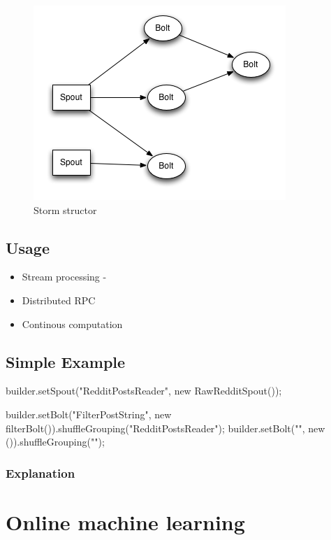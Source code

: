 \documentclass[journal]{IEEEtran/IEEEtran}
\begin{document}
\begin{figure}[htbp]
    \begin{center}
        \includegraphics[scale=0.45]{img/topology.png}
        \caption{Storm structor}
        \label{topology}
    \end{center}
\end{figure}

\subsection{Usage}

\begin{itemize}
    \item Stream processing - 
    \item Distributed RPC
    \item Continous computation
\end{itemize}

\subsection{Simple Example}

\begin{code}
        builder.setSpout("RedditPostsReader", new RawRedditSpout());

        builder.setBolt("FilterPostString", new filterBolt()).shuffleGrouping("RedditPostsReader");
        builder.setBolt("", new ()).shuffleGrouping("");


\end{code}
\subsubsection*{Explanation}

\section{Online machine learning}
\end{document}
